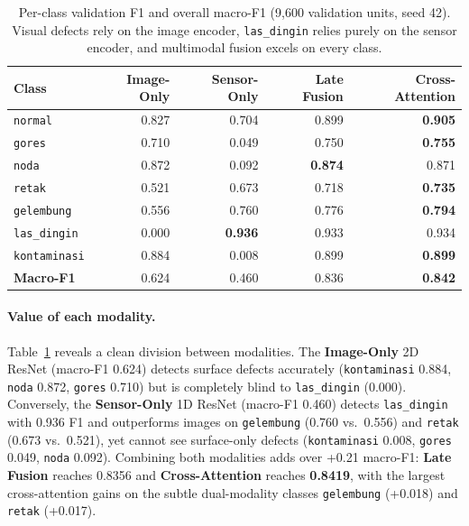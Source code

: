 \begin{table}[t]
  \centering
  \caption{Per-class validation F1 and overall macro-F1 (9{,}600 validation units, seed 42).
  Visual defects rely on the image encoder, \texttt{las\_dingin} relies purely on the sensor
  encoder, and multimodal fusion excels on every class.}
  \label{tab:t1-modality}
  \small
  \begin{tabular}{lrrrr}
    \toprule
    Class & Image-Only & Sensor-Only & Late Fusion & Cross-Attention \\
    \midrule
    \texttt{normal}      & 0.827 & 0.704 & 0.899 & \textbf{0.905} \\
    \texttt{gores}       & 0.710 & 0.049 & 0.750 & \textbf{0.755} \\
    \texttt{noda}        & 0.872 & 0.092 & \textbf{0.874} & 0.871 \\
    \texttt{retak}       & 0.521 & 0.673 & 0.718 & \textbf{0.735} \\
    \texttt{gelembung}   & 0.556 & 0.760 & 0.776 & \textbf{0.794} \\
    \texttt{las\_dingin} & 0.000 & \textbf{0.936} & 0.933 & 0.934 \\
    \texttt{kontaminasi} & 0.884 & 0.008 & 0.899 & \textbf{0.899} \\
    \midrule
    \textbf{Macro-F1}    & 0.624 & 0.460 & 0.836 & \textbf{0.842} \\
    \bottomrule
  \end{tabular}
\end{table}

\paragraph{Value of each modality.} Table~\ref{tab:t1-modality} reveals a clean division between
modalities. The \textbf{Image-Only} 2D ResNet (macro-F1 0.624) detects surface defects accurately
(\texttt{kontaminasi} 0.884, \texttt{noda} 0.872, \texttt{gores} 0.710) but is completely blind to
\texttt{las\_dingin} (0.000). Conversely, the \textbf{Sensor-Only} 1D ResNet (macro-F1 0.460)
detects \texttt{las\_dingin} with 0.936 F1 and outperforms images on \texttt{gelembung} (0.760 vs.\
0.556) and \texttt{retak} (0.673 vs.\ 0.521), yet cannot see surface-only defects
(\texttt{kontaminasi} 0.008, \texttt{gores} 0.049, \texttt{noda} 0.092). Combining both modalities
adds over +0.21 macro-F1: \textbf{Late Fusion} reaches 0.8356 and \textbf{Cross-Attention} reaches
\textbf{0.8419}, with the largest cross-attention gains on the subtle dual-modality classes
\texttt{gelembung} (+0.018) and \texttt{retak} (+0.017).

